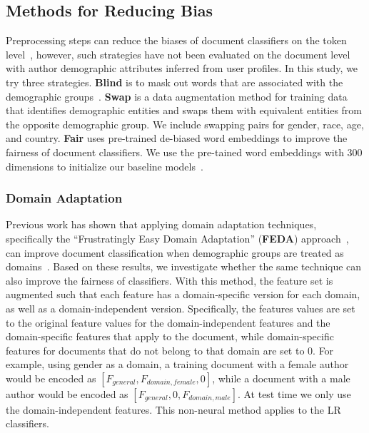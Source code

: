 \subsection{Methods for Reducing Bias}
Preprocessing steps can reduce the biases of document classifiers on the token level~\cite{dixon2018measuring,park2018reducing,garg2019counterfactual}, however, such strategies have not been evaluated on the document level with author demographic attributes inferred from user profiles.
In this study, we try three strategies. %
\textbf{Blind} is to mask out words that are associated with the demographic groups~\cite{garg2019counterfactual}.
\textbf{Swap} is a data augmentation method for training data that identifies demographic entities and swaps them with equivalent entities from the opposite demographic group. We include swapping pairs for gender, race, age, and country.
\textbf{Fair} uses pre-trained de-biased word embeddings to improve the fairness of document classifiers. 
We use the pre-tained word embeddings with 300 dimensions to initialize our baseline models~\cite{bolukbasi2016man}.


\subsubsection{Domain Adaptation}

Previous work has shown that applying domain adaptation techniques, specifically the ``Frustratingly Easy Domain Adaptation'' (\textbf{FEDA}) approach~\cite{daume2007frustratingly},
can improve document classification when demographic groups are treated as domains~\cite{volkova2013exploring,lynn2017human}.
Based on these results, we investigate whether the same technique can also improve the fairness of classifiers.
With this method, the feature set is augmented such that each feature has a domain-specific version for each domain, as well as a domain-independent version.
Specifically, the features values are set to the original feature values for the domain-independent features and the domain-specific features that apply to the document, while domain-specific features for documents that do not belong to that domain are set to $0$.
For example, using gender as a domain, a training document with a female author would be encoded as $[F_{general}, F_{domain, female}, 0]$, while a document with a male author would be encoded as $[F_{general}, 0, F_{domain, male}]$.
At test time we only use the domain-independent features.
This non-neural method applies to the LR classifiers.


